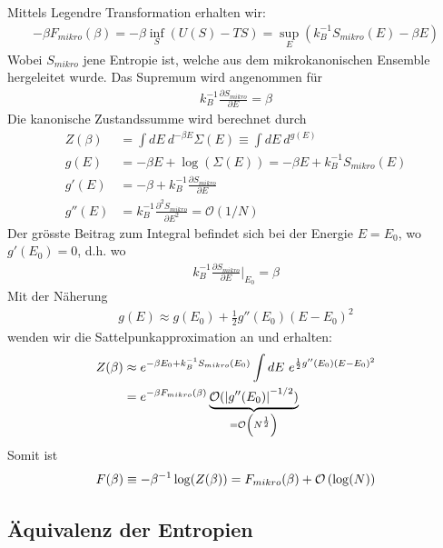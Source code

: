 Mittels Legendre Transformation erhalten wir:
\begin{align*}
    - \beta F_{mikro} (\beta) = - \beta \inf_S (U(S) - T S)
    = \sup_E (k_B^{-1} S_{mikro} (E) - \beta E)
\end{align*}
Wobei $S_{mikro}$ jene Entropie ist, welche aus dem mikrokanonischen Ensemble
hergeleitet wurde. Das Supremum wird angenommen für
\begin{align*}
    k_B^{-1} \frac{\partial S_{mikro}}{\partial E} = \beta
\end{align*}
Die kanonische Zustandssumme wird berechnet durch
\begin{align*}
    Z(\beta) &= \int dE \ d^{-\beta E} \Sigma(E)
    \equiv \int dE \ d^{g(E)}
    \\
    g(E) &= -\beta E + \log(\Sigma(E)) = - \beta E + k_B^{-1} S_{mikro} (E)
    \\
    g'(E) &= - \beta + k_B^{-1} \frac{\partial S_{mikro}}{\partial E}
    \\
    g''(E) &= k_B^{-1} \frac{\partial^2 S_{mikro}}{\partial E^2} = \mathcal{O}(1/N)
\end{align*}
Der grösste Beitrag zum Integral befindet sich bei der Energie $E=E_0$, wo
$g'(E_0) = 0$, d.h. wo
\begin{align*}
    k_B^{-1} \frac{\partial S_{mikro}}{\partial E} \Big|_{E_0} = \beta
\end{align*}
Mit der Näherung
\begin{align*}
    g(E) \approx g(E_0) + \frac{1}{2} g''(E_0) (E-E_0)^2
\end{align*}
wenden wir die Sattelpunkapproximation an und erhalten:
\begin{align*}
    Z(\beta) &\approx e^{-\beta E_0 + k_B^{-1} S_{mikro}(E_0)}
        \int dE \ e^{\frac{1}{2} g''(E_0)(E-E_0)^2}
    \\
    &= e^{-\beta F_{mikro}(\beta)} \underbrace{\mathcal{O} (\left\vert g''(E_0) \right\vert^{-1/2})}_{= \mathcal{O}\left( N^{\frac{1}{2}} \right)}
\end{align*}
Somit ist
\begin{align*}
    F(\beta) \equiv - \beta^{-1} \log(Z(\beta)) = F_{mikro} (\beta) + \mathcal{O} \left( \log(N) \right)
\end{align*}

\subsection{Äquivalenz der Entropien}

